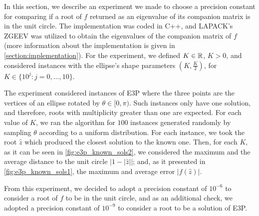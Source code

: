 In this section, we describe an experiment we made to choose a precision constant for comparing if a root of $f$ returned as an eigenvalue of its companion matrix is in the unit circle. The implementation was coded in C++, and LAPACK's ZGEEV was utilized to obtain the eigenvalues of the companion matrix of $f$ (more information about the implementation is given in \autoref{section:implementation}). For the experiment, we defined $K\in\mathbb{R}$, $K>0$, and considered instances with the ellipse's shape parameters $(K, \frac{K}{2})$, for $K\in\{10^j\colon j=0,\dots,10\}$.

The experiment considered instances of E3P where the three points are the vertices of an ellipse rotated by $\theta\in[0, \pi)$. Such instances only have one solution, and therefore, roots with multiplicity greater than one are expected.
For each value of $K$, we ran the algorithm for $100$ instances generated randomly by sampling $\theta$ according to a uniform distribution. For each instance, we took the root $\hat{z}$ which produced the closest solution to the known one. Then, for each $K$, as it can be seen in \autoref{fig:e3p_known_sols2}, we considered the maximum and the average distance to the unit circle $|1-|\hat{z}||$; and, as it presented in \autoref{fig:e3p_known_sols1}, the maximum and average error $|f(\hat{z})|$.

From this experiment, we decided to adopt a precision constant of $10^{-6}$ to consider a root of $f$ to be in the unit circle, and as an additional check, we adopted a precision constant of $10^{-9}$ to consider a root to be a solution of E3P.

